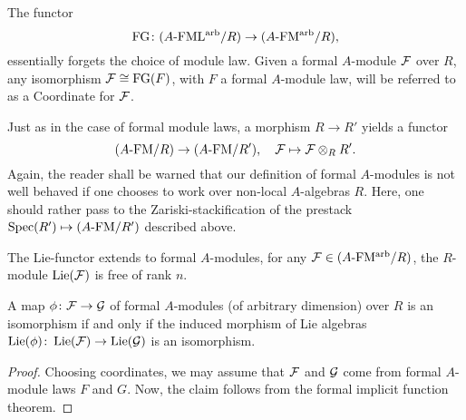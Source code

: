 \documentclass[../main.tex]{subfiles}
\begin{document}

The functor
\begin{equation*}
  \textnormal{FG}\colon  {({A}\textnormal-\allowbreak\mathrm{FML^{arb}}/{R})} \to {({A}\textnormal-\allowbreak\mathrm{FM^{arb}}/{R})},
\end{equation*}
essentially forgets the choice of module law. Given a formal $A$-module
$\mathcal{F}$ over $R$, any isomorphism $\mathcal{F} \cong \textnormal{FG}(F)$, with $F$ a formal $A$-module
law, will be referred to as a Coordinate for $\mathcal{F}$.

Just as in the case of formal 
module laws, a morphism $R \to R'$ yields a functor 
\begin{equation*} 
  {({A}\textnormal-\allowbreak\mathrm{FM}/{R})} \to {({A}\textnormal-\allowbreak\mathrm{FM}/{R'})}, \quad \mathcal{F} \mapsto \mathcal{F} \otimes_R R'.
\end{equation*}
Again, the reader shall be warned that our definition of formal $A$-modules is not well behaved if one chooses to work over non-local
$A$-algebras $R$. Here, one should rather pass to the Zariski-stackification
of the prestack $\operatorname{Spec}(R') \mapsto {({A}\textnormal-\allowbreak\mathrm{FM}/{R'})}$ described above.

The Lie-functor extends to formal $A$-modules, for any $\mathcal{F} \in {({A}\textnormal-\allowbreak\mathrm{FM^{arb}}/{R})}$,
the $R$-module $\operatorname{Lie}(\mathcal{F})$ is free of rank $n$.
\begin{lem}\label{lem:IsosCheckOnLie}
  A map $\phi\colon  \mathcal{F} \to \mathcal{G}$ of formal $A$-modules (of arbitrary dimension) over $R$ is an isomorphism if and only if the induced morphism of Lie algebras $\operatorname{Lie}(\phi)\colon  \operatorname{Lie}(\mathcal{F}) \to \operatorname{Lie}(\mathcal{G})$ is an isomorphism.
\begin{proof}
  Choosing coordinates, we may assume that $\mathcal{F}$ and $\mathcal{G}$ come from formal $A$-module
  laws $F$ and $G$. Now, the claim follows from the formal implicit function theorem.
\end{proof}
\end{lem}
\end{document}
